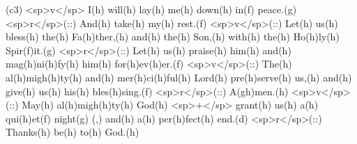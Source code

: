 (c3) <sp>v</sp> I(h) will(h) lay(h) me(h) down(h) in(f) peace.(g) <sp>r</sp>(::) And(h) take(h) my(h) rest.(f) <sp>v</sp>(::) Let(h) us(h) bless(h) the(h) Fa(h)ther,(h) and(h) the(h) Son,(h) with(h) the(h) Ho(h)ly(h) Spir(f)it.(g) <sp>r</sp>(::) Let(h) us(h) praise(h) him(h) and(h) mag(h)ni(h)fy(h) him(h) for(h)ev(h)er.(f) <sp>v</sp>(::) The(h) al(h)migh(h)ty(h) and(h) mer(h)ci(h)ful(h) Lord(h) pre(h)serve(h) us,(h) and(h) give(h) us(h) his(h) bles(h)sing.(f) <sp>r</sp>(::) A(gh)men.(h) <sp>v</sp>(::) May(h) al(h)migh(h)ty(h) God(h) <sp>+</sp> grant(h) us(h) a(h) qui(h)et(f) night(g) (,) and(h) a(h) per(h)fect(h) end.(d) <sp>r</sp>(::) Thanks(h) be(h) to(h) God.(h)